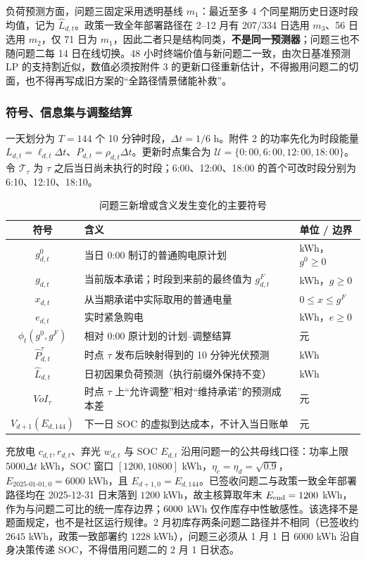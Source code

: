 负荷预测方面，问题三固定采用透明基线 \(m_1\)：最近至多 4 个同星期历史日逐时段均值，记为 \(\widehat L_{d,t}\)。政策一致全年部署路径在 2--12 月有 207/334 日选用 \(m_3\)、56 日选用 \(m_2\)，仅 71 日为 \(m_1\)，因此二者只是结构同类，\textbf{不是同一预测器}；问题三也不随问题二每 14 日在线切换。48 小时终端价值与新问题二一致，由次日基准预测 LP 的支持割近似，数值必须按附件 3 的更新口径重新估计，不得搬用问题二的切面，也不得再写成旧方案的“全路径情景储能补救”。

\subsubsection{符号、信息集与调整结算}

一天划分为 \(T=144\) 个 10 分钟时段，\(\Delta t=1/6\) h。附件 2 的功率先化为时段能量 \(L_{d,t}=\ell_{d,t}\Delta t\)、\(P_{d,t}=\rho_{d,t}\Delta t\)。更新时点集合为 \(\mathcal U=\{0{:}00,6{:}00,12{:}00,18{:}00\}\)。令 \(\mathcal T_\tau\) 为 \(\tau\) 之后当日尚未执行的时段；6:00、12:00、18:00 的首个可改时段分别为 6:10、12:10、18:10。

\begin{table}[H]
\centering
\caption{问题三新增或含义发生变化的主要符号}
\label{tab:q3-symbols}
\small
\begin{tabular}{cll}
\toprule
符号 & 含义 & 单位 / 边界 \\
\midrule
\(g^{0}_{d,t}\) & 当日 0:00 制订的普通购电原计划 & kWh，\(g^{0}\ge 0\) \\
\(g_{d,t}\) & 当前版本承诺；时段到来前的最终值为 \(g^{F}_{d,t}\) & kWh，\(g\ge 0\) \\
\(x_{d,t}\) & 从当期承诺中实际取用的普通电量 & \(0\le x\le g^{F}\) \\
\(e_{d,t}\) & 实时紧急购电 & kWh，\(e\ge 0\) \\
\(\phi_t(g^{0},g^{F})\) & 相对 0:00 原计划的计划--调整结算 & 元 \\
\(\widehat P^{\tau}_{d,t}\) & 时点 \(\tau\) 发布后映射得到的 10 分钟光伏预测 & kWh \\
\(\widehat L_{d,t}\) & 日初因果负荷预测（执行前缀外保持不变） & kWh \\
\(VoI_{\tau}\) & 时点 \(\tau\) 上“允许调整”相对“维持承诺”的预测成本差 & 元 \\
\(V_{d+1}(E_{d,144})\) & 下一日 SOC 的虚拟到达成本，不计入当日账单 & 元 \\
\bottomrule
\end{tabular}
\end{table}

充放电 \(c_{d,t},r_{d,t}\)、弃光 \(w_{d,t}\) 与 SOC \(E_{d,t}\) 沿用问题一的公共母线口径：功率上限 \(5000\Delta t\) kWh，SOC 窗口 \([1200,10800]\) kWh，\(\eta_c=\eta_d=\sqrt{0.9}\)，\(E_{2025\text{-}01\text{-}01,0}=6000\) kWh，且 \(E_{d+1,0}=E_{d,144}\)。已签收问题二与政策一致全年部署路径均在 2025-12-31 日末落到 \(1200\) kWh，故主核算取年末 \(E_{\mathrm{end}}=1200\) kWh，作为与问题二可比的统一库存边界；\(6000\) kWh 仅作库存中性敏感性。该选择不是题面规定，也不是社区运行规律。2 月初库存两条问题二路径并不相同（已签收约 \(2645\) kWh，政策一致部署约 \(1228\) kWh），问题三必须从 1 月 1 日 \(6000\) kWh 沿自身决策传递 SOC，不得借用问题二的 2 月 1 日状态。

